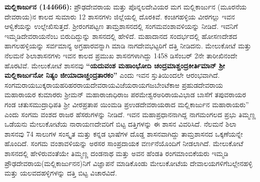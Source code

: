 \textbf{ಮಲ್ಲಿಕಾರ್ಜುನ (144666): }ಪ್ರೌಢದೇವರಾಯ ಮತ್ತು ಪೊನ್ನಲದೇವಿಯರ ಮಗ ಮಲ್ಲಿಕಾರ್ಜುನ (ಮೂರನೆಯ ದೇವರಾಯ)ನ ಕಾಲದ ಸುಮಾರು 12 ಶಾಸನಗಳು ಜಿಲ್ಲೆಯಲ್ಲಿ ದೊರಕಿವೆ. ಕಂಚಿಗಹಳ್ಳಿಯ ವೀರಗಲ್ಲು ಇವನ ಆಳ್ವಿಕೆಯನ್ನು ಉಲ್ಲೇಖಿಸುತ್ತದೆ. ಶ‍್ರೀರಂಗಪಟ್ಟಣ ತಾಮ್ರಶಾಸನದಲ್ಲಿ ಸಂಗಮವಂಶಾವಳಿಯನ್ನು ನೀಡಿದೆ. ಇವನಿಗೆ ಇಮ್ಮಡಿದೇವರಾಯ\-ನೆಂಬ ಬಿರುದಿದ್ದುನ್ನು ಶಾಸನದಲ್ಲಿ ಹೇಳಿದೆ. ಮಹಾದಾನದ ಸಂದರ್ಭದಲ್ಲಿ ಹೋಸಣದೇಶದ ಹಾಗಲಹಳ್ಳಿಯನ್ನು ಸರ್ವಮಾನ್ಯ ಅಗ್ರಹಾರವನ್ನಾಗಿ ಮಾಡಿ ನಾಗದೇವಭಟ್ಟರಿಗೆ ದತ್ತಿ ನೀಡಿದನು. ಮೇಲುಕೋಟೆ ಮತ್ತು ನೆಲಮನೆ ಶಿಲಾಶಾಸನಗಳು ಇವನ ಕಾಲದ ಪ್ರಮುಖ ಶಾಸನಗಳಾಗಿದ್ದು 1458 ಡಿಸೆಂಬರ್​ 2ನೇ ತಾರೀಖಿನಂದೇ ಹೊರಟಿವೆ. ಮೇಲುಕೋಟೆ ಶಾಸನವು \textbf{“ಯದುವಂಶ ಮಹಾಂಭೋದಿ ಚಂದ್ರಮಾಶ್ಚಂದ್ರಕೀರ್ತಿಮಾನ್​ ಶ‍್ರೀ ಮಲ್ಲಿಕಾರ್ಜುನೋ ನಿತ್ಯಂ ಜೀಯಾದಾಚ್ಚಂದ್ರತಾರಕಂ”} ಎಂದು ಇವನ ಸ್ತುತಿಯಿಂದಲೇ ಆರಂಭವಾಗಿದೆ. ಸಂಗಮರಾಯಬುಕ್ಕರಾಯಹರಿಹರರಾಯದೇವರಾಯವಿಜೆಯರಾಯಗಜಬೇಂಟೆಕಾಱ ಪ್ರಹುಡದೇವರಾಯ ಮಹಾರಾಯರ ಕುಮಾರರು ಶ‍್ರೀಮನ್​ ಮಹಾರಾಜಾಧಿರಾಜ ಪರಮೇಶ್ವರ\break ಅರಿರಾಯವಿಭಾಡ ಬಾಸೆಗೆ ತಪುವರಾಯರ ಗಂಡ ಚತುಸಮುದ್ರಾಧಿಪತಿ ಶ‍್ರೀ ವೀರಪ್ರತಾಪ ಯಿಂಮಡಿ ಪ್ರಉಡದೇವರಾಯ\-ರಾದ ಮಲ್ಲಿಕಾರ್ಜುನ ಮಹಾರಾಯರು” ಎಂದು ಸಂಗಮ ವಂಶದ ರಾಜರ ಹೆಸರುಗಳನ್ನು ನೀಡಿದೆ. ಇವನ ಮಹಾಪ್ರಧಾನ\-ನಾಗಿದ್ದ ನಾಗಮಂಗಲದ ಪ್ರಭು ತಿಮ್ಮಣ್ಣ ಒಡೆಯನು ಮೇಲುಕೋಟೆಯ ನಾರಾಯಣದೇವರಿಗೆ ಬಿಟ್ಟ ದತ್ತಿಗಳನ್ನು ಈ ಶಾಸನ ವಿವರಿಸಿದೆ. ನೆಲಮನೆ ಶಿಲಾ ಶಾಸನವು 74 ಸಾಲುಗಳ ಸಂಸ್ಕೃತ ಮತ್ತು ಕನ್ನಡ ಭಾಷೆಗಳ ದೊಡ್ಡ ಶಾಸನವಾಗಿದ್ದು ತಾಮ್ರಶಾಸನದ ಒಕ್ಕಣೆಯನ್ನೇ ಹೊಂದಿದೆ. ಸಂಗಮ ವಂಶಾವಳಿಯನ್ನು ಅರಸರ ಸಾಂಪ್ರದಾಯಕ ವರ್ಣನೆಯೊಂದಿಗೆ ನೀಡಲಾಗಿದೆ. ಮೇಲುಕೋಟೆ ಶಾಸನದಲ್ಲಿ ಹೇಳಿರುವಂತೆಯೇ ತಿಮ್ಮಣ್ಣ ದಂಡನಾಥ ಮತ್ತು ಅವನ ಹೆಂಡತಿ ರಂಗಮಾಂಬಿಕೆಯರು ಇಮ್ಮಡಿ ಪ್ರೌಢದೇವರಾಯ(ಮಲ್ಲಿಕಾರ್ಜುನನ)ನಿಗೆ ವಿಜ್ಞಾಪನೆ ಮಾಡಿಕೊಂಡು ಮೇಲುಕೋಟೆಯ ದೇವಾಲಯಗಳಿಗೆ\break ಬಲ್ಲೇನಹಳ್ಳಿ ಮತ್ತು ಯಲವದಹಳ್ಳಿಗಳನ್ನು ದತ್ತಿ ಬಿಟ್ಟ ವಿಚಾರವಿದೆ. 


